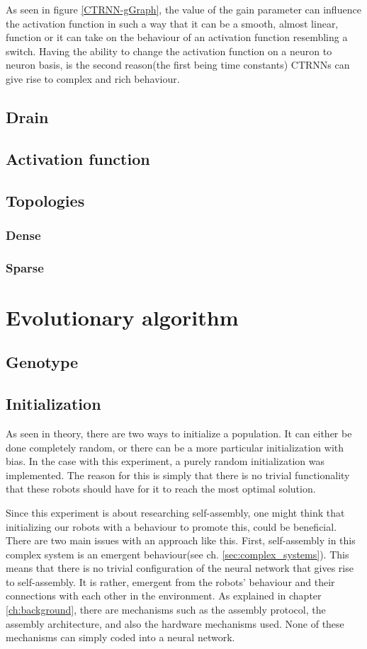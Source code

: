 As seen in figure \ref{CTRNN-gGraph}, the value of the gain parameter can influence the activation function in such a way that it can be a smooth, almost linear, function or it can take on the behaviour of an activation function resembling a switch.
Having the ability to change the activation function on a neuron to neuron basis, is the second reason(the first being time constants) CTRNNs can give rise to complex and rich behaviour.



	\subsection{Drain}
	\subsection{Activation function}
	\subsection{Topologies}
		\subsubsection{Dense}
		\subsubsection{Sparse}
\clearpage
\section{Evolutionary algorithm}
\subsection{Genotype}
\label{sec:genotype}
\subsection{Initialization}
As seen in theory, there are two ways to initialize a population. 
It can either be done completely random, or there can be a more particular initialization with bias. 
In the case with this experiment, a purely random initialization was implemented.
The reason for this is simply that there is no trivial functionality that these robots should have for it to reach the most optimal solution.

Since this experiment is about researching self-assembly, one might think that initializing our robots with a behaviour to promote this, could be beneficial.
There are two main issues with an approach like this.
First, self-assembly in this complex system is an emergent behaviour(see ch. \ref{sec:complex_systems}).
This means that there is no trivial configuration of the neural network that gives rise to self-assembly.
It is rather, emergent from the robots' behaviour and their connections with each other in the environment.
As explained in chapter \ref{ch:background}, there are mechanisms such as the assembly protocol, the assembly architecture, and also the hardware mechanisms used.
None of these mechanisms can simply coded into a neural network.

